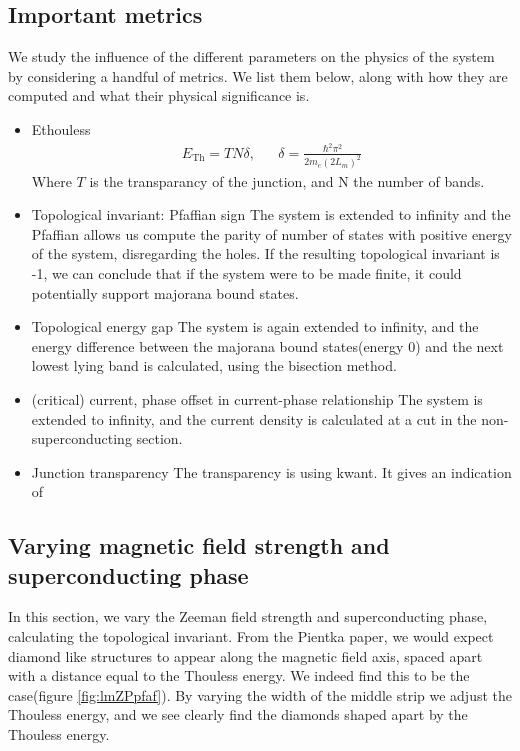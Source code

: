 \documentclass[10pt,a4paper]{article}
\begin{document}
	\subsection{Important metrics}
	We study the influence of the different parameters on the physics of the system by considering a handful of metrics. We list them below, along with how they are computed and what their physical significance is.
		\begin{itemize}
			\item \Gls{Ethouless}
				\begin{align}\label{eq:thouless}
				E_\text{Th} = TN\delta
				, && \delta = \frac{\hbar^2 \pi^2}
				{2 m_e \left( 2 L_m \right)^2}
				\end{align}
			Where $T$ is the transparancy of the junction, and N the number of bands.
			\item Topological invariant: Pfaffian sign
				\subitem The system is extended to infinity and the Pfaffian allows us compute the parity of number of states with positive energy of the system, disregarding the holes. If the resulting topological invariant is -1, we can conclude that if the system were to be made finite, it could potentially support majorana bound states.

			\item Topological energy gap
				\subitem The system is again extended to infinity, and the energy difference between the majorana bound states(energy 0) and the next lowest lying band is calculated, using the bisection method.
				
			\item (critical) current, phase offset in current-phase relationship
				\subitem The system is extended to infinity, and the current density is calculated at a cut in the non-superconducting section.
			
			\item Junction transparency
				\subitem The transparency is using kwant. It gives an indication of 
		\end{itemize}
\newpage
	\subsection{Varying magnetic field strength and superconducting phase}
		In this section, we vary the Zeeman field strength and superconducting phase, calculating the topological invariant. 
		From the Pientka paper, we would expect diamond like structures to appear along the magnetic field axis, spaced apart with a distance equal to the Thouless energy. We indeed find this to be the case(figure \ref{fig:lmZPpfaf}). By varying the width of the middle strip we adjust the Thouless energy, and we see clearly find the diamonds shaped apart by the Thouless energy.
		
\end{document}

